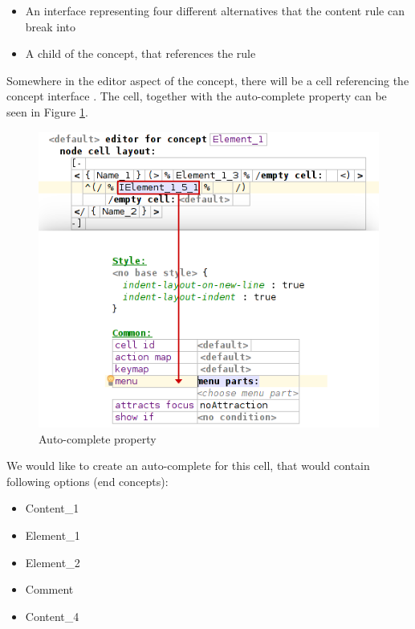 \begin{itemize}
	\item An interface  representing four different alternatives that the content rule can break into

	\item A child of the  concept, that references the  rule
\end{itemize}

Somewhere in the editor aspect of the  concept, there will be a cell referencing the concept interface .
The cell, together with the auto-complete property can be seen in Figure \ref{fig:autocomplete_cell}.
\\

\begin{figure}[h]
	\centering
	\includegraphics[scale=0.72]{./img/autocomplete_cell.png}
	\caption{Auto-complete property}
	\label{fig:autocomplete_cell}
\end{figure}

We would like to create an auto-complete for this cell, that would contain following options (end concepts):

\begin{itemize}
	\itemsep0em
	\item Content{\_}1
	\item Element{\_}1
	\item Element{\_}2
	\item Comment
	\item Content{\_}4
\end{itemize}

